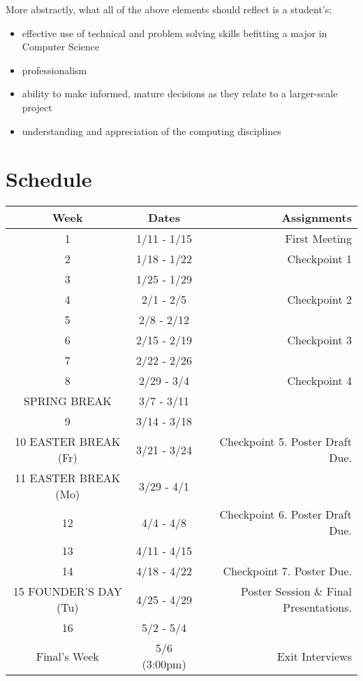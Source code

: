 \documentclass[10pt]{article}
\begin{document}
More abstractly, what all of the above elements should reflect is a student's: 
\begin{itemize}
\item effective use of technical and problem solving skills befitting a major in Computer Science
\item professionalism
\item ability to make informed, mature decisions as they relate to a larger-scale project
\item understanding and appreciation of the computing disciplines
\end{itemize}

\section{Schedule}


\begin{center}
\begin{tabular}{|c|c|r|}
\hline 
Week & Dates & Assignments \\
\hline
1 & 1/11 - 1/15 &  First Meeting\\
\hline
2 & 1/18 - 1/22 & Checkpoint 1 \\
\hline
3 & 1/25 - 1/29 &   \\
\hline
4 & 2/1 - 2/5 & Checkpoint 2  \\
\hline
5 & 2/8 - 2/12 &  \\
\hline
6 & 2/15 - 2/19 & Checkpoint 3 \\
\hline
7 & 2/22 - 2/26 &   \\
\hline
8 & 2/29 - 3/4 & Checkpoint 4  \\
\hline 
SPRING BREAK & 3/7 - 3/11 &  \\
\hline
9 & 3/14 - 3/18 &  \\
\hline
10 EASTER BREAK (Fr)& 3/21 - 3/24 & Checkpoint 5. Poster Draft Due.\\
\hline
11 EASTER BREAK (Mo)& 3/29 - 4/1 &  \\
\hline
12 & 4/4 - 4/8 & Checkpoint 6. Poster Draft Due.\\
\hline
13 & 4/11 - 4/15 &   \\
\hline
14 & 4/18 - 4/22 &  Checkpoint 7. Poster Due. \\
\hline
15 FOUNDER'S DAY (Tu) & 4/25 - 4/29 & Poster Session \& Final Presentations. \\ 
\hline
16 & 5/2 - 5/4 & \\
\hline
Final's Week & 5/6 (3:00pm) & Exit Interviews \\ 
\hline
\end{tabular}
\end{center}
\end{document}
